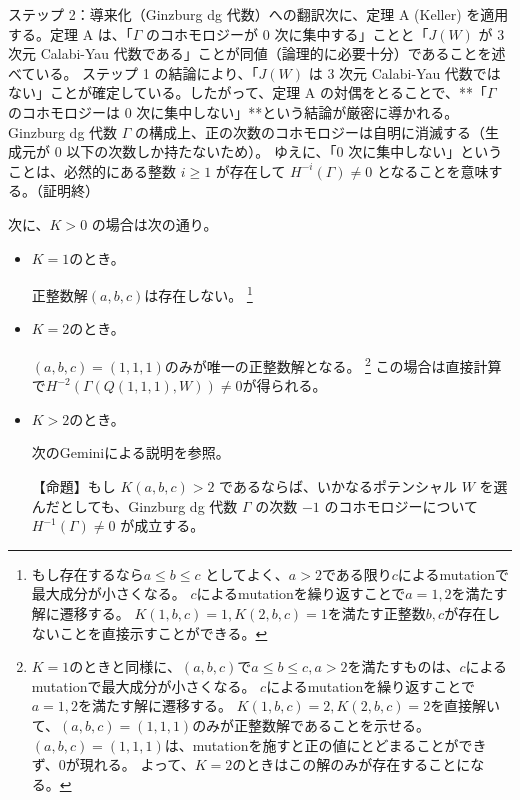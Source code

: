 \documentclass[uplatex,12pt,dvipdfmx]{jsarticle}
\theoremstyle{definition}
\numberwithin{equation}{section}
\begin{document}
\begin{myquote}
	ステップ 2：導来化（Ginzburg dg 代数）への翻訳次に、定理 A (Keller) を適用する。定理 A は、「$\Gamma$ のコホモロジーが 0 次に集中する」ことと「$J(W)$ が 3 次元 Calabi-Yau 代数である」ことが同値（論理的に必要十分）であることを述べている。
	ステップ 1 の結論により、「$J(W)$ は 3 次元 Calabi-Yau 代数ではない」ことが確定している。したがって、定理 A の対偶をとることで、**「$\Gamma$ のコホモロジーは 0 次に集中しない」**という結論が厳密に導かれる。
	Ginzburg dg 代数 $\Gamma$ の構成上、正の次数のコホモロジーは自明に消滅する（生成元が 0 以下の次数しか持たないため）。
	ゆえに、「0 次に集中しない」ということは、必然的にある整数 $i \ge 1$ が存在して $H^{-i}(\Gamma) \neq 0$ となることを意味する。（証明終）
\end{myquote}

次に、$K > 0$ の場合は次の通り。
\begin{itemize}
	\item $K=1$のとき。
	
	正整数解$(a,b,c)$は存在しない。
	\footnote{
		もし存在するなら$a\le b\le c$ としてよく、$a>2$である限り$c$によるmutationで最大成分が小さくなる。
		$c$によるmutationを繰り返すことで$a=1,2$を満たす解に遷移する。
		$K(1,b,c)=1,K(2,b,c)=1$を満たす正整数$b,c$が存在しないことを直接示すことができる。
	}
	\item $K=2$のとき。
	
	$(a,b,c)=(1,1,1)$のみが唯一の正整数解となる。
	\footnote{
		$K=1$のときと同様に、$(a,b,c)$で$a\le b\le c,a> 2$を満たすものは、$c$によるmutationで最大成分が小さくなる。
		$c$によるmutationを繰り返すことで$a=1,2$を満たす解に遷移する。
		$K(1,b,c)=2,K(2,b,c)=2$を直接解いて、$(a,b,c)=(1,1,1)$のみが正整数解であることを示せる。
		$(a,b,c)=(1,1,1)$は、mutationを施すと正の値にとどまることができず、$0$が現れる。
		よって、$K=2$のときはこの解のみが存在することになる。
	}
	この場合は直接計算で$H^{-2}(\Gamma(Q(1,1,1),W)) \neq 0$が得られる。
	\item $K>2$のとき。
	
	次のGeminiによる説明を参照。
	\begin{myquote}
		【命題】もし $K(a, b, c) > 2$ であるならば、いかなるポテンシャル $W$ を選んだとしても、Ginzburg dg 代数 $\Gamma$ の次数 $-1$ のコホモロジーについて $H^{-1}(\Gamma) \neq 0$ が成立する。


\end{myquote}
\end{itemize}
\end{document}
